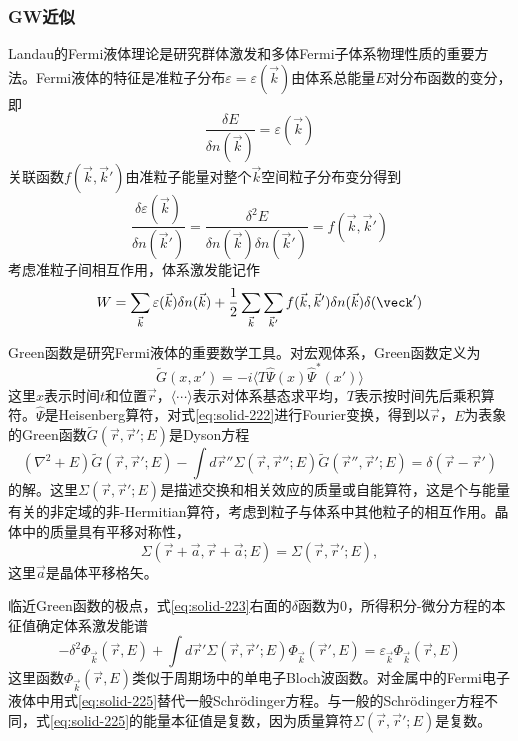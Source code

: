 \subsubsection{GW近似}
Landau的Fermi液体理论是研究群体激发和多体Fermi子体系物理性质的重要方法\cite{Landau}。Fermi液体的特征是准粒子分布$\varepsilon=\varepsilon(\vec k)$由体系总能量$E$对分布函数的变分，即
\begin{equation}
  \frac{\delta E}{\delta n(\vec k)}=\varepsilon(\vec k)
  \label{eq:solid-219}
\end{equation}
关联函数$f(\vec k,\vec k')$由准粒子能量对整个$\vec k$空间粒子分布变分得到
\begin{equation}
  \frac{\delta\varepsilon(\vec k)}{\delta n(\vec k')}=\frac{\delta^2E}{\delta n(\vec k)\delta n(\vec k')}=f(\vec k,\vec k')
  \label{eq:solid-220}
\end{equation}
考虑准粒子间相互作用，体系激发能记作
\begin{equation}
  W=\sum_{\vec k}\varepsilon(\vec k)\delta n(\vec k)+\frac12\sum_{\vec k}\sum_{\vec k'}f(\vec k,\vec k')\delta n(\vec k)\delta(\veck')
  \label{eq:solid-221}
\end{equation}

Green函数是研究Fermi液体的重要数学工具。对宏观体系，Green函数定义为\cite{Lifshitz}
\begin{equation}
  \tilde G(x,x')=-i\langle T\hat\Psi(x)\hat\Psi^{\ast}(x')\rangle
  \label{eq:solid-222}
\end{equation}
这里$x$表示时间$t$和位置$\vec r$，$\langle\cdots\rangle$表示对体系基态求平均，$T$表示按时间先后乘积算符。$\hat\Psi$是Heisenberg算符，对式\eqref{eq:solid-222}进行Fourier变换，得到以$\vec r$，$E$为表象的Green函数$\tilde G(\vec r,\vec r';E)$是Dyson方程\cite{Lifshitz}
\begin{equation}
  (\nabla^2+E)\tilde G(\vec r,\vec r';E)-\int d\vec r''\Sigma(\vec r,\vec r'';E)\tilde G(\vec r'',\vec r';E)=\delta(\vec r-\vec r')
  \label{eq:solid-223}
\end{equation}
的解。这里$\Sigma(\vec r,\vec r';E)$是描述交换和相关效应的质量或自能算符，这是个与能量有关的非定域的非-Hermitian算符，考虑到粒子与体系中其他粒子的相互作用。晶体中的质量具有平移对称性，
\begin{equation}
  \Sigma(\vec r+\vec a,\vec r+\vec a;E)=\Sigma(\vec r,\vec r';E),
  \label{eq:solid:224}
\end{equation}
这里$\vec a$是晶体平移格矢。

临近Green函数的极点，式\eqref{eq:solid-223}右面的$\delta$函数为0，所得积分-微分方程的本征值确定体系激发能谱\cite{Lifshitz,PR145-561_1966}
\begin{equation}
  -\delta^2\Phi_{\vec k}(\vec r,E)+\int d\vec r'\Sigma(\vec r,\vec r';E)\Phi_{\vec k}(\vec r',E)=\varepsilon_{\vec k}\Phi_{\vec k}(\vec r,E) 
  \label{eq:solid-225}
\end{equation}
这里函数$\Phi_{\vec k}(\vec r,E)$类似于周期场中的单电子Bloch波函数。对金属中的Fermi电子液体中用式\eqref{eq:solid-225}替代一般Schr\"odinger方程。与一般的Schr\"odinger方程不同，式\eqref{eq:solid-225}的能量本征值是复数，因为质量算符$\Sigma(\vec r,\vec r';E)$是复数。

